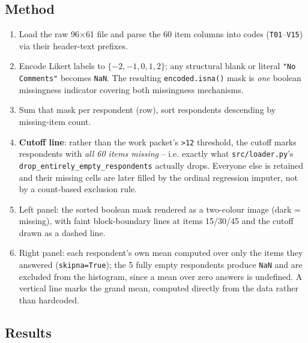 \documentclass[11pt]{article}
\begin{document}
\subsection{Method}
\begin{enumerate}
  \item Load the raw 96$\times$61 file and parse the 60 item columns into
        codes (\texttt{T01}--\texttt{V15}) via their header-text prefixes.
  \item Encode Likert labels to $\{-2,-1,0,1,2\}$; any structural blank or
        literal \texttt{"No Comments"} becomes \texttt{NaN}. The resulting
        \texttt{encoded.isna()} mask is \emph{one} boolean missingness
        indicator covering both missingness mechanisms.
  \item Sum that mask per respondent (row), sort respondents descending by
        missing-item count.
  \item \textbf{Cutoff line}: rather than the work packet's \texttt{>12}
        threshold, the cutoff marks respondents with \emph{all 60 items
        missing} -- i.e. exactly what \texttt{src/loader.py}'s
        \texttt{drop\_entirely\_empty\_respondents} actually drops. Everyone
        else is retained and their missing cells are later filled by the
        ordinal regression imputer, not by a count-based exclusion rule.
  \item Left panel: the sorted boolean mask rendered as a two-colour image
        (dark = missing), with faint block-boundary lines at items 15/30/45
        and the cutoff drawn as a dashed line.
  \item Right panel: each respondent's own mean computed over only the items
        they answered (\texttt{skipna=True}); the 5 fully empty respondents
        produce \texttt{NaN} and are excluded from the histogram, since a
        mean over zero answers is undefined. A vertical line marks the grand
        mean, computed directly from the data rather than hardcoded.
\end{enumerate}

\subsection{Results}
\end{document}
